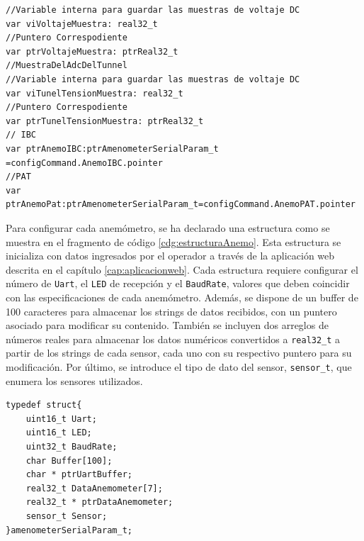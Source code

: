 \begin{lstlisting}[style=yakindustyle, caption={Variables para almacenar en cada iteración una muestra de su magnitud correspondiente.}, label=cdg:var_const_Adquisition,basicstyle=\ttfamily\fontsize{8}{8}\selectfont]
//Variable interna para guardar las muestras de voltaje DC
var viVoltajeMuestra: real32_t
//Puntero Correspodiente
var ptrVoltajeMuestra: ptrReal32_t
//MuestraDelAdcDelTunnel
//Variable interna para guardar las muestras de voltaje DC
var viTunelTensionMuestra: real32_t
//Puntero Correspodiente
var ptrTunelTensionMuestra: ptrReal32_t
// IBC
var ptrAnemoIBC:ptrAmenometerSerialParam_t =configCommand.AnemoIBC.pointer
//PAT
var ptrAnemoPat:ptrAmenometerSerialParam_t=configCommand.AnemoPAT.pointer

\end{lstlisting}


Para configurar cada anemómetro, se ha declarado una estructura como se muestra en el fragmento de código \ref{cdg:estructuraAnemo}. Esta estructura se inicializa con datos ingresados por el operador a través de la aplicación web descrita en el capítulo \ref{cap:aplicacionweb}. Cada estructura requiere configurar el número de \texttt{Uart}, el \texttt{LED} de recepción y el \texttt{BaudRate}, valores que deben coincidir con las especificaciones de cada anemómetro. Además, se dispone de un buffer de 100 caracteres para almacenar los strings de datos recibidos, con un puntero asociado para modificar su contenido. También se incluyen dos arreglos de números reales para almacenar los datos numéricos convertidos a \texttt{real32\_t} a partir de los strings de cada sensor, cada uno con su respectivo puntero para su modificación. Por último, se introduce el tipo de dato del sensor, \texttt{sensor\_t}, que enumera los sensores utilizados.



% 
\begin{lstlisting}[style=cstyle, caption={Estructura de datos para anemómetro.}, label=cdg:estructuraAnemo,basicstyle=\ttfamily\fontsize{8}{8}\selectfont]
typedef struct{
	uint16_t Uart;
	uint16_t LED;
	uint32_t BaudRate;
	char Buffer[100];
	char * ptrUartBuffer;
	real32_t DataAnemometer[7];
	real32_t * ptrDataAnemometer;
	sensor_t Sensor;
}amenometerSerialParam_t;
\end{lstlisting}
 
